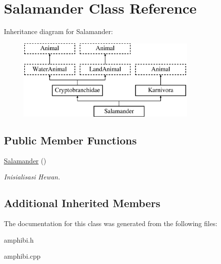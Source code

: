 \hypertarget{class_salamander}{}\section{Salamander Class Reference}
\label{class_salamander}
Inheritance diagram for Salamander\+:\begin{figure}[H]
\begin{center}
\leavevmode
\includegraphics[height=4.000000cm]{class_salamander}
\end{center}
\end{figure}
\subsection*{Public Member Functions}
\begin{DoxyCompactItemize}
\item 
\hyperlink{class_salamander_a50b3dba15ae1463748102d0fcefddb3d}{Salamander} ()\hypertarget{class_salamander_a50b3dba15ae1463748102d0fcefddb3d}{}\label{class_salamander_a50b3dba15ae1463748102d0fcefddb3d}

\begin{DoxyCompactList}\small\item\em Inisialisasi Hewan. \end{DoxyCompactList}\end{DoxyCompactItemize}
\subsection*{Additional Inherited Members}


The documentation for this class was generated from the following files\+:\begin{DoxyCompactItemize}
\item 
amphibi.\+h\item 
amphibi.\+cpp\end{DoxyCompactItemize}

